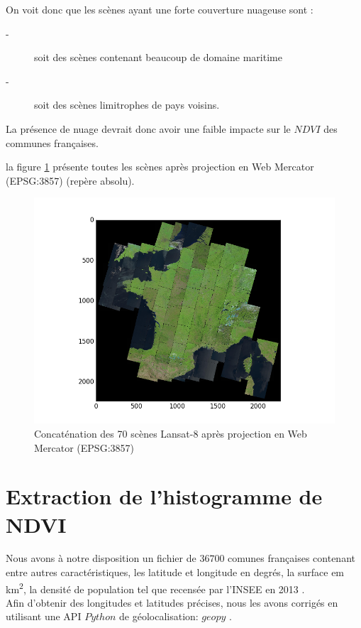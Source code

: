 \documentclass{book}
\begin{document}
On voit donc que les scènes ayant une forte couverture nuageuse sont :
\begin{description}
\item[-] soit des scènes contenant beaucoup de domaine maritime
\item[-] soit des scènes limitrophes de pays voisins. 
\end{description}
La présence de nuage devrait donc avoir une faible impacte sur le $NDVI$ des communes françaises.
\clearpage

la figure \ref{couverture} présente toutes les scènes après projection en Web Mercator (EPSG:3857) (repère absolu).

\begin{figure}[H]
\begin{center}
\includegraphics[scale=0.7]{images/france-covering.png}
\end{center}
\caption{Concaténation des 70 scènes Lansat-8 après projection en Web Mercator (EPSG:3857)}
\label{couverture}
\end{figure}
\clearpage

\chapter{Extraction de l'histogramme de NDVI}

Nous avons à notre disposition un fichier de $36700$ comunes françaises contenant entre autres caractéristiques, les latitude et longitude en degrés,
la surface em km\textsuperscript{2}, la densité de population tel que recensée par l'INSEE en 2013 \cite{insee_pop2013}.\\
Afin d'obtenir des longitudes et latitudes précises, nous les avons corrigés en utilisant une API $Python$ de géolocalisation: $geopy$ \cite{geopy}.\\
\end{document}
